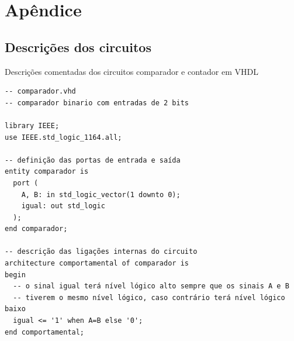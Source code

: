 \documentclass[a4,12pt]{horizon-theme}
\newenvironment{code}{\captionsetup{type=listing}}{}
\begin{document}
\newpage
\appendix
\section*{Apêndice}
\renewcommand{\thesubsection}{\Alph{subsection}}

\subsection{Descrições dos circuitos}
\label{ap:vhdl}

Descrições comentadas dos circuitos comparador e contador em VHDL

\begin{code}
  \label{lst:comparador}
  \begin{verbatim}
-- comparador.vhd
-- comparador binario com entradas de 2 bits

library IEEE;
use IEEE.std_logic_1164.all;

-- definição das portas de entrada e saída
entity comparador is
  port (
    A, B: in std_logic_vector(1 downto 0);
    igual: out std_logic
  );
end comparador;

-- descrição das ligações internas do circuito
architecture comportamental of comparador is
begin
  -- o sinal igual terá nível lógico alto sempre que os sinais A e B
  -- tiverem o mesmo nível lógico, caso contrário terá nível lógico baixo
  igual <= '1' when A=B else '0';
end comportamental;
\end{verbatim}
\end{code}
\end{document}
